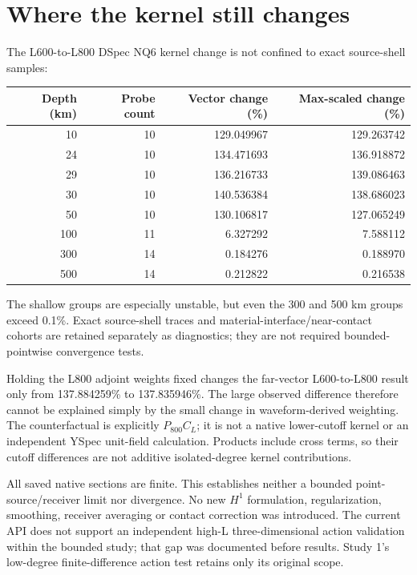 \documentclass[11pt,a4paper]{article}
\begin{document}
\section{Where the kernel still changes}
The L600-to-L800 DSpec NQ6 kernel change is not confined to exact source-shell samples:
\begin{center}\small\begin{tabular}{rrrr}\toprule
Depth (km) & Probe count & Vector change (\%) & Max-scaled change (\%)\\\midrule
10 & 10 & 129.049967 & 129.263742 \\
24 & 10 & 134.471693 & 136.918872 \\
29 & 10 & 136.216733 & 139.086463 \\
30 & 10 & 140.536384 & 138.686023 \\
50 & 10 & 130.106817 & 127.065249 \\
100 & 11 & 6.327292 & 7.588112 \\
300 & 14 & 0.184276 & 0.188970 \\
500 & 14 & 0.212822 & 0.216538 \\
\bottomrule\end{tabular}\end{center}
The shallow groups are especially unstable, but even the 300 and 500 km groups exceed 0.1\%. Exact source-shell traces and material-interface/near-contact cohorts are retained separately as diagnostics; they are not required bounded-pointwise convergence tests.

Holding the L800 adjoint weights fixed changes the far-vector L600-to-L800 result only from 137.884259\% to 137.835946\%. The large observed difference therefore cannot be explained simply by the small change in waveform-derived weighting. The counterfactual is explicitly $P_{800}C_L$; it is not a native lower-cutoff kernel or an independent YSpec unit-field calculation. Products include cross terms, so their cutoff differences are not additive isolated-degree kernel contributions.

All saved native sections are finite. This establishes neither a bounded point-source/receiver limit nor divergence. No new $H^1$ formulation, regularization, smoothing, receiver averaging or contact correction was introduced. The current API does not support an independent high-L three-dimensional action validation within the bounded study; that gap was documented before results. Study 1's low-degree finite-difference action test retains only its original scope.
\end{document}
